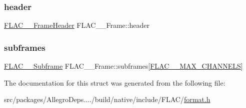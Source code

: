 \mbox{\label{struct_f_l_a_c_____frame_ae39796592bb27512110976fe7b80ce06}} 
\subsubsection{\texorpdfstring{header}{header}}
{\footnotesize\ttfamily \hyperlink{struct_f_l_a_c_____frame_header}{F\+L\+A\+C\+\_\+\+\_\+\+Frame\+Header} F\+L\+A\+C\+\_\+\+\_\+\+Frame\+::header}

\mbox{\label{struct_f_l_a_c_____frame_a526e3e6173e7a6db752e7a44bff3e91d}} 
\subsubsection{\texorpdfstring{subframes}{subframes}}
{\footnotesize\ttfamily \hyperlink{struct_f_l_a_c_____subframe}{F\+L\+A\+C\+\_\+\+\_\+\+Subframe} F\+L\+A\+C\+\_\+\+\_\+\+Frame\+::subframes\mbox{[}\hyperlink{group__flac__format_ga488aa5678a58d08f984f5d39185b763d}{F\+L\+A\+C\+\_\+\+\_\+\+M\+A\+X\+\_\+\+C\+H\+A\+N\+N\+E\+LS}\mbox{]}}



The documentation for this struct was generated from the following file\+:\begin{DoxyCompactItemize}
\item 
src/packages/\+Allegro\+Deps..../build/native/include/\+F\+L\+A\+C/\hyperlink{format_8h}{format.\+h}\end{DoxyCompactItemize}
